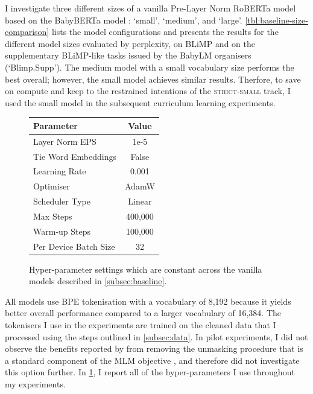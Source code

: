 I investigate three different sizes of a vanilla Pre-Layer Norm RoBERTa model \citep{liu2019roberta} based on the BabyBERTa model \citep{huebner2021babyberta}: `small', `medium', and `large'. \cref{tbl:baseline-size-comparison} lists the model configurations and presents the results for the different model sizes evaluated by perplexity, on BLiMP \citep{warstadt2020blimp} and on the supplementary BLiMP-like tasks issued by the BabyLM organisers (`Blimp.Supp'). The medium model with a small vocabulary size performs the best overall; however, the small model achieves similar results. Therfore, to save on compute and keep to the restrained intentions of the \textsc{strict-small} track, I used the small model in the subsequent curriculum learning experiments.

\begin{figure}
    \centering
    \small
    \begin{tabular}{lc}
    \toprule
         Parameter& Value\\
    \midrule
         Layer Norm EPS& 1e-5 \\
         Tie Word Embeddings & False \\
         Learning Rate & 0.001 \\
         Optimiser & AdamW \\
         Scheduler Type & Linear\\
         Max Steps & 400,000 \\
         Warm-up Steps & 100,000\\
         Per Device Batch Size & 32 \\
    \bottomrule
    \end{tabular}
    \caption{Hyper-parameter settings which are constant across the vanilla models described in \cref{subsec:baseline}.}
    \label{tbl:baseline_hyperparams}
    \vspace{-1em}
\end{figure}

All models use BPE tokenisation \citep{gage1994bpe} with a vocabulary of 8,192 because it yields better overall performance compared to a larger vocabulary of 16,384. The tokenisers I use in the experiments are trained on the cleaned data that I processed using the steps outlined in \cref{subsec:data}. In pilot experiments, I did not observe the benefits reported by \citet{huebner2021babyberta} from removing the unmasking procedure that is a standard component of the MLM objective \citep{devlin2019bert}, and therefore did not investigate this option further. In \cref{tbl:baseline_hyperparams}, I report all of the hyper-parameters I use throughout my experiments.

